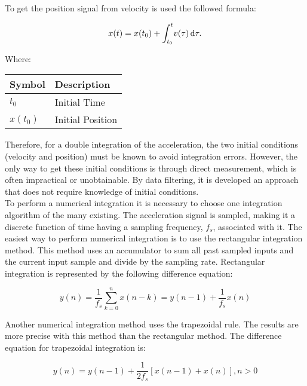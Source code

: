 \documentclass[tesi]{subfiles}
\begin{document}
\noindent To get the position signal from velocity is used the followed formula:
\begin{center}
\begin{equation}
 {\large x(t) = x(t_{0}) + \int_{t_{0}}^{t} \! v(\tau) \, \mathrm{d}\tau.}
\end{equation}

Where: \\
\begin{table}[ht]
\centering
    \begin{tabular}{ | l | l |}
    
    \hline
    Symbol & Description \\ \hline
   \quad  $t_{0}$ & Initial Time \\ \hline
	   \quad  $x(t_{0})$ & Initial Position \\  
\hline 
    \end{tabular}
\end{table}
\end{center}
\noindent Therefore, for a double integration of the acceleration, the two initial
conditions (velocity and position) must be known to avoid integration errors. However,
the only way to get these initial conditions is through direct measurement, which is often
impractical or unobtainable. By  data filtering, it is developed an approach that does not require knowledge of initial conditions.\\
To perform a numerical integration it is necessary to choose one integration algorithm of the many existing. 
The acceleration signal is sampled, making it a discrete function of time having a sampling frequency, $f_{s}$, associated with it. The easiest way to perform numerical integration is to use the rectangular integration method. This method uses an accumulator to sum all past sampled inputs and the current input sample and divide by the sampling rate. Rectangular integration is represented by the following difference equation:

\begin{equation} 
y(n) = \dfrac{1}{f_{s}} \sum_{k=0}^{n} x(n-k) = y(n-1) + \dfrac{1}{f_{s}} x(n)
\end{equation}\label{eq:rectangular}


\noindent Another numerical integration method uses the trapezoidal rule. 
The results are more precise with this method than the rectangular method. The difference equation for trapezoidal integration is:

\begin{equation}
y(n) = y(n-1) + \dfrac{1}{2 f_{s}}[x(n-1) + x(n)], n > 0
\end{equation}\label{eq:trapezoidal}
\end{document}
